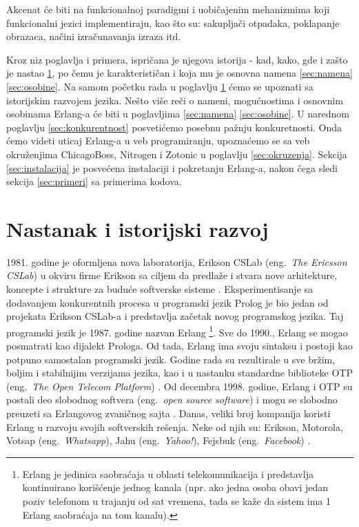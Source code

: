 \documentclass[a4paper]{article}
\begin{document}
{Akcenat će biti na funkcionalnoj paradigmi i uobičajenim mehanizmima koji funkcionalni jezici implementiraju, kao što su: sakupljači otpadaka, poklapanje obrazaca, načini izračunavanja izraza itd.

Kroz niz poglavlja i primera, ispričana je njegova istorija - kad, kako, gde i zašto je nastao \ref{sec:nastanak}, po čemu je karakterističan i koja mu je osnovna namena \ref{sec:namena} \ref{sec:osobine}. 
Na samom početku rada u poglavlju \ref{sec:nastanak} ćemo se upoznati sa istorijskim razvojem jezika. Nešto više reči o nameni, mogućnostima i osnovnim osobinama Erlang-a će biti u poglavljima \ref{sec:namena} \ref{sec:osobine}. U narednom poglavlju \ref{sec:konkurentnost} posvetićemo posebnu pažnju konkuretnosti. Onda ćemo videti uticaj Erlang-a u veb programiranju, upoznaćemo se sa veb okruženjima ChicagoBoss, Nitrogen i Zotonic u poglavlju \ref{sec:okruzenja}. Sekcija \ref{sec:instalacija} je posvećena instalaciji i pokretanju Erlang-a, nakon čega sledi sekcija \ref{sec:primeri} sa primerima kodova.

\section{Nastanak i istorijski razvoj}
\label{sec:nastanak}
1981. godine je oformljena nova laboratorija, Erikson CSLab (eng.~{\em The Ericsson CSLab}) u okviru firme Erikson sa
ciljem da predlaže i stvara nove arhitekture, koncepte i strukture za buduće softverske sisteme \cite{phdthesis}.
Eksperimentisanje sa dodavanjem konkurentnih procesa u programski jezik Prolog je bio jedan
od projekata Erikson CSLab-a i predstavlja začetak novog programskog jezika.
Taj programski jezik je 1987. godine nazvan Erlang
\footnote{ Erlang je jedinica saobraćaja u oblasti telekomunikacija 
i predstavlja kontinuirano korišćenje jednog kanala 
(npr. ako jedna osoba obavi jedan poziv telefonom u trajanju od sat vremena, 
tada se kaže da sistem ima 1 Erlang saobraćaja na tom kanalu).}.    
Sve do 1990., Erlang se mogao posmatrati kao dijalekt Prologa. Od tada, Erlang
ima svoju sintaksu i postoji kao potpuno samostalan programski jezik.
Godine rada su rezultirale u sve bržim, boljim i stabilnijim verzijama jezika, kao
i u nastanku standardne biblioteke OTP (eng.~{\em The Open Telecom Platform}) \cite{phdthesis}.
Od decembra 1998. godine, Erlang i OTP su postali deo slobodnog softvera (eng.~{\em open source software})
i mogu se slobodno preuzeti sa Erlangovog zvaničnog sajta \cite{sajt}.
Danas, veliki broj kompanija koristi Erlang u razvoju
svojih softverskih rešenja. Neke od njih su: Erikson, Motorola, Votsap (eng.~{\em Whatsapp}), 
Jahu (eng.~{\em Yahoo!}), Fejsbuk (eng.~{\em Facebook}) \cite{sajt}.


}
\end{document}
